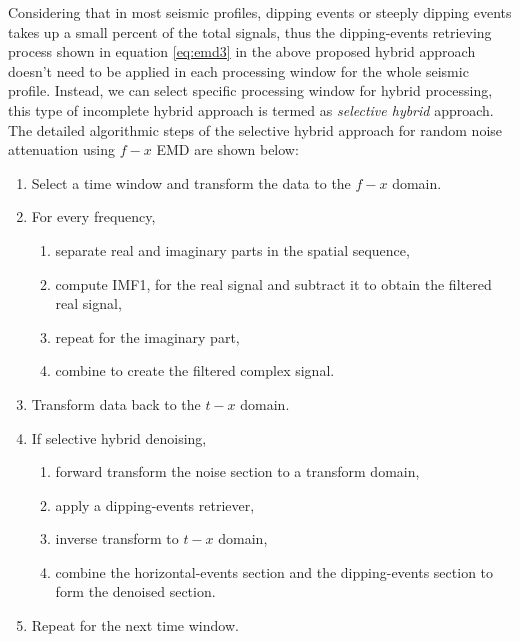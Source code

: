 Considering that in most seismic profiles, dipping events or steeply dipping events takes up a small percent of the total signals, thus the dipping-events retrieving process shown in equation \ref{eq:emd3} in the above proposed hybrid approach doesn't need to be applied in each processing window for the whole seismic profile. Instead, we can select specific processing window for hybrid processing, this type of incomplete hybrid approach is termed as \textit{selective hybrid} approach.
The detailed algorithmic steps of the selective hybrid approach for random noise attenuation using $f-x$ EMD are shown below:
\begin{enumerate}
\item 
Select a time window and transform the data to the $f-x$ domain.
\item 
For every frequency, 
\begin{enumerate}
\item
separate real and imaginary parts in the spatial sequence,
\item
compute IMF1, for the real signal and subtract it to obtain the filtered real signal,
\item
repeat for the imaginary part,
\item
combine to create the filtered complex signal.
\end{enumerate}
\item
Transform data back to the $t-x$ domain.
\item If selective hybrid denoising,
\begin{enumerate}
\item forward transform the noise section to a transform domain,
\item
apply a dipping-events retriever,
\item 
inverse transform to $t-x$ domain,
\item combine the horizontal-events section and the dipping-events section to form the denoised section.
\end{enumerate}

\item
Repeat for the next time window.
\end{enumerate}

